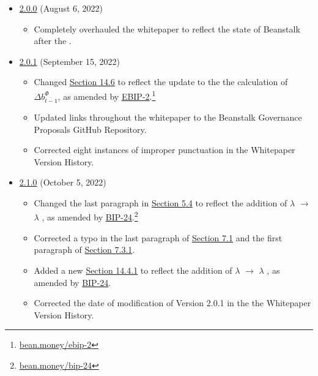 \documentclass[class=article, crop=false]{standalone}
\begin{document}
\begin{itemize}[topsep=0pt, itemsep=3pt,leftmargin=16pt]
\begin{itemize}
    \end{itemize}  
        \item \href{https://github.com/BeanstalkFarms/Beanstalk-Whitepaper/blob/master/version-history/beanstalk2_0_0.pdf}{2.0.0} (August 6, 2022)
    \begin{itemize}
        \item Completely overhauled the whitepaper to reflect the state of Beanstalk after the .
    \end{itemize}  
        \item \href{https://github.com/BeanstalkFarms/Beanstalk-Whitepaper/blob/master/version-history/beanstalk2_0_1.pdf}{2.0.1} (September 15, 2022)
    \begin{itemize}
        \item Changed \hyperlink{subsection.14.6}{Section 14.6} to reflect the update to the the calculation of $\Delta b_{\overline{t-1}}^{\Phi}$, as amended by \href{https://bean.money/ebip-2}{EBIP-2}.\footnote{\href{https://bean.money/ebip-2}{bean.money/ebip-2}}
        \item Updated  links throughout the whitepaper to the Beanstalk Governance Proposals GitHub Repository.
        \item Corrected eight instances of improper punctuation in the Whitepaper Version History.
    \end{itemize}  
        \item \href{https://github.com/BeanstalkFarms/Beanstalk-Whitepaper/blob/master/version-history/beanstalk2_1_0.pdf}{2.1.0} (October 5, 2022)
    \begin{itemize}
        \item Changed the last paragraph in \hyperlink{subsection.5.4}{Section 5.4} to reflect the addition of $\lambda$ $\rightarrow$ $\lambda$ , as amended by \href{https://bean.money/bip-24}{BIP-24}.\footnote{\href{https://bean.money/bip-24}{bean.money/bip-24}}
        \item Corrected a typo in the last paragraph of \hyperlink{subsection.7.1}{Section 7.1} and the first paragraph of \hyperlink{subsubsection.7.3.1}{Section 7.3.1}.
        \item Added a new \hyperlink{subsubsection.14.4.1}{Section 14.4.1} to reflect the addition of $\lambda$ $\rightarrow$ $\lambda$ , as amended by \href{https://bean.money/bip-24}{BIP-24}.
        \item Corrected the date of modification of Version 2.0.1 in the the Whitepaper Version History.

\end{itemize}
\end{itemize}
\end{document}
